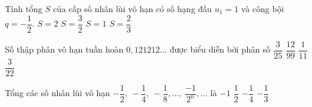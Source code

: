 \begin{ex}%
	 Tính tổng $S$ của cấp số nhân lùi vô hạn có số hạng đầu $u_1=1$ và công bội $q=-\dfrac{1}{2}$.
	 \choice
		 {$S=2$}
		{\True $S=\dfrac{3}{2}$} 
		{$S=1$} 
		{$S=\dfrac{2}{3}$} 
	 \loigiai{\[S=\dfrac{u_1}{1-q}=\dfrac{1}{1+\dfrac{1}{2}}=\dfrac{2}{3}.
		\] 
	 }
\end{ex}

\begin{ex}%
	Số thập phân vô hạn tuần hoàn $0{,}121212\ldots$ được biểu  diễn bởi phân số
	 \choice
		{$\dfrac{3}{25}$} 
		 {\True $\dfrac{12}{99}$}
		{$\dfrac{1}{11}$} 
		 {$\dfrac{3}{22}$}
\end{ex}

\begin{ex}%
	Tổng các số nhân  lùi vô hạn $- \dfrac{1}{2},\ -\dfrac{1}{4},\ -\dfrac{1}{8},\ldots,\ \dfrac{-1}{2^n},\ldots$ là
	 \choice
		{\True $-1$} 
		 {$\dfrac{1}{2}$}
		 {$-\dfrac{1}{4}$}
		 {$-\dfrac{1}{3}$}
\end{ex}

